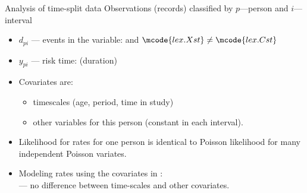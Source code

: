\begin{frame}[fragile]{Analysis of time-split data}
Observations (records) classified by $p$---person and $i$---interval
\begin{itemize}[<+->]
\item $d_{pi}$ --- events in the variable: 
 and $\mcode{lex.Xst} \neq \mcode{lex.Cst}$
\item $y_{pi}$ --- risk time:  (duration)\\
\item Covariates are:

\begin{itemize}
\item timescales (age, period, time in study)
\item other variables for this person (constant in each interval).
\end{itemize}
\item Likelihood for rates for one person is identical to Poisson
  likelihood for many independent Poisson variates.
\item Modeling rates using the covariates in :\\
  --- no difference between time-scales and other covariates.
\end{itemize}
\end{frame}



